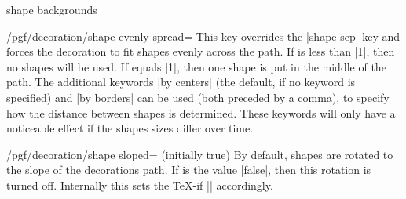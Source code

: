 \begin{decoration}{shape backgrounds}
    \begin{key}{/pgf/decoration/shape evenly spread=}
        This key overrides the |shape sep| key and forces the decoration to fit
         shapes evenly across the path. If  is less
        than |1|, then no shapes will be used. If  equals |1|,
        then one shape is put in the middle of the path. The additional
        keywords |by centers| (the default, if no keyword is specified) and
        |by borders| can be used (both preceded by a comma), to specify how the
        distance between shapes is determined. These keywords will only have a
        noticeable effect if the shapes sizes differ over time.
\begin{codeexample}[]
\end{codeexample}
    \end{key}

    \begin{key}{/pgf/decoration/shape sloped= (initially true)}
        By default, shapes are rotated to the slope of the decorations path. If
         is the value |false|, then this rotation is turned off.
        Internally this sets the \TeX-if |\ifpgfshapedecorationsloped|
        accordingly.
\begin{codeexample}[]
\end{codeexample}
    \end{key}


\end{decoration}
